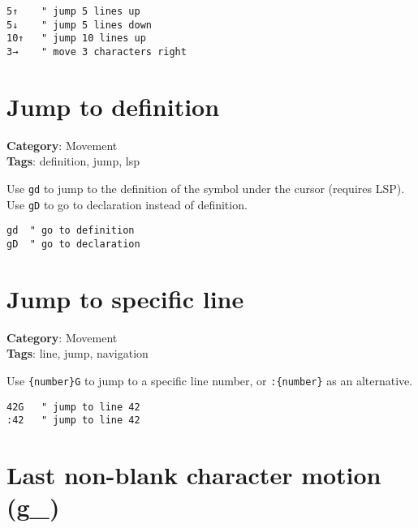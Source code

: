 {{{{{{{\begin{Exa*}{}
\begin{Verbatim}[fontsize=\footnotesize, breaklines, breakanywhere]
5↑    " jump 5 lines up
5↓    " jump 5 lines down
10↑   " jump 10 lines up
3→    " move 3 characters right
\end{Verbatim}
\end{Exa*}

\section{Jump to definition}

\textbf{Category}: Movement\\ \textbf{Tags}: definition, jump, lsp
\vspace{0.5cm}

Use {\footnotesize \Verb§gd§} to jump to the definition of the symbol under the cursor (requires LSP). Use {\footnotesize \Verb§gD§} to go to declaration instead of definition.

\begin{Exa*}{}
\begin{Verbatim}[fontsize=\footnotesize, breaklines, breakanywhere]
gd  " go to definition
gD  " go to declaration
\end{Verbatim}
\end{Exa*}

\section{Jump to specific line}

\textbf{Category}: Movement\\ \textbf{Tags}: line, jump, navigation
\vspace{0.5cm}

Use {\footnotesize \Verb§{number}G§} to jump to a specific line number, or {\footnotesize \Verb§:{number}§} as an alternative.

\begin{Exa*}{}
\begin{Verbatim}[fontsize=\footnotesize, breaklines, breakanywhere]
42G   " jump to line 42
:42   " jump to line 42
\end{Verbatim}
\end{Exa*}

\section{Last non-blank character motion (g\_)}

}}}}}}}
